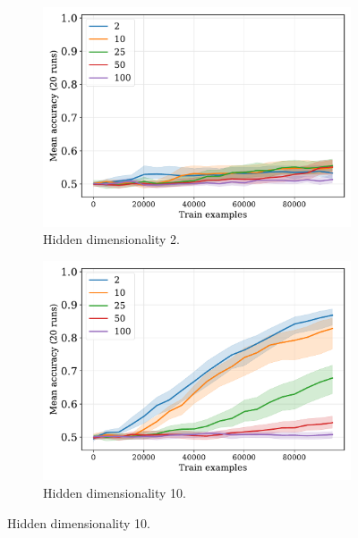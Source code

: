 \documentclass{article}
\begin{document}
\begin{figure}[H]
  \centering

  \begin{subfigure}{0.45\linewidth}
    \includegraphics[width=1\textwidth]{./flatpremack-h1-train_size-embed_dim-hidden_dim=2.pdf}
    \caption{Hidden dimensionality 2.}
  \end{subfigure}
  \hfill
  \begin{subfigure}{0.45\linewidth}
    \includegraphics[width=1\textwidth]{./flatpremack-h1-train_size-embed_dim-hidden_dim=10.pdf}
    \caption{Hidden dimensionality 10.}
  \end{subfigure}

  \vspace{24pt}


\end{figure}
\end{document}
